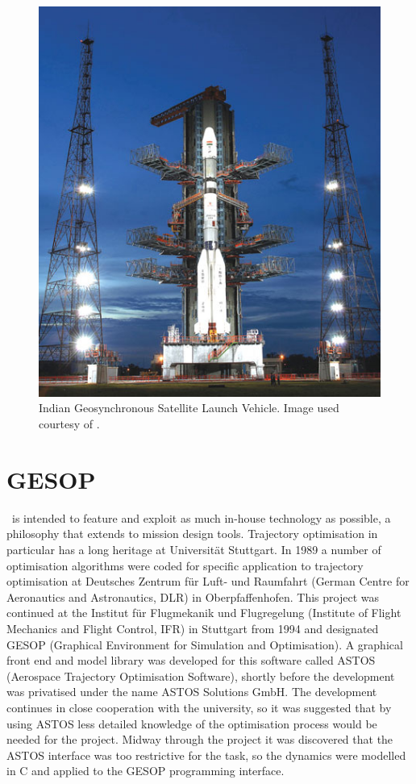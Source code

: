 \begin{figure} [ht]
\centering
\includegraphics[scale=0.50]{Images/GSLV2.jpg}
\caption{Indian Geosynchronous Satellite Launch Vehicle. Image used courtesy of \textcite{web_GSLV}.} \label{fig:GSLV}
\end{figure}

\section{GESOP} \label{sec:GESOP}

\BW\ is intended to feature and exploit as much in-house technology as possible, a philosophy that extends to mission design tools. Trajectory optimisation in particular has a long heritage at Universit\"{a}t Stuttgart. In 1989 a number of optimisation algorithms were coded for specific application to trajectory optimisation at Deutsches Zentrum f\"{u}r Luft- und Raumfahrt (German Centre for Aeronautics and Astronautics, DLR) in Oberpfaffenhofen. This project was continued at the Institut f\"{u}r Flugmekanik und Flugregelung (Institute of Flight Mechanics and Flight Control, IFR) in Stuttgart from 1994 and designated GESOP (Graphical Environment for Simulation and Optimisation). A graphical front end and model library was developed for this software called ASTOS (Aerospace Trajectory Optimisation Software), shortly before the development was privatised under the name ASTOS Solutions GmbH. The development continues in close cooperation with the university, so it was suggested that by using ASTOS less detailed knowledge of the optimisation process would be needed for the project. Midway through the project it was discovered that the ASTOS interface was too restrictive for the task, so the dynamics were modelled in C and applied to the GESOP programming interface.

